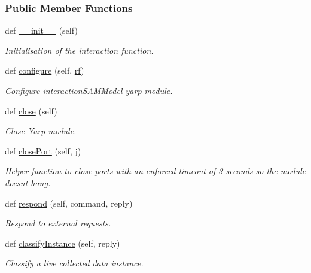 \subsubsection*{Public Member Functions}
\begin{DoxyCompactItemize}
\item 
def \hyperlink{group__icubclient__SAM__Core_aca87a6ab67a29d61efc36af661771988}{\+\_\+\+\_\+init\+\_\+\+\_\+} (self)
\begin{DoxyCompactList}\small\item\em Initialisation of the interaction function. \end{DoxyCompactList}\item 
def \hyperlink{group__icubclient__SAM__Core_aa2f9d39586fd99450d4feab075d9c9e4}{configure} (self, \hyperlink{namespaceSAM_1_1SAM__Core_1_1interactionSAMModel_a5b02d7b171d64258c379d4a115b9b6f6}{rf})
\begin{DoxyCompactList}\small\item\em Configure \hyperlink{group__icubclient__SAM__Core_classSAM_1_1SAM__Core_1_1interactionSAMModel_1_1interactionSAMModel}{interaction\+S\+A\+M\+Model} yarp module. \end{DoxyCompactList}\item 
def \hyperlink{group__icubclient__SAM__Core_a347c3010f6cd5f9280819be41ec39bf1}{close} (self)
\begin{DoxyCompactList}\small\item\em Close Yarp module. \end{DoxyCompactList}\item 
def \hyperlink{group__icubclient__SAM__Core_a426a489d4b25536db51228b0049cca03}{close\+Port} (self, j)
\begin{DoxyCompactList}\small\item\em Helper function to close ports with an enforced timeout of 3 seconds so the module doesn\textquotesingle{}t hang. \end{DoxyCompactList}\item 
def \hyperlink{group__icubclient__SAM__Core_a5c4de12a5f89c6885bebdf8d0c37d806}{respond} (self, command, reply)
\begin{DoxyCompactList}\small\item\em Respond to external requests. \end{DoxyCompactList}\item 
def \hyperlink{group__icubclient__SAM__Core_ae12b4f78693e01bfc895e1474badcaf7}{classify\+Instance} (self, reply)
\begin{DoxyCompactList}\small\item\em Classify a live collected data instance. \end{DoxyCompactList}\item 

\end{DoxyCompactItemize}
